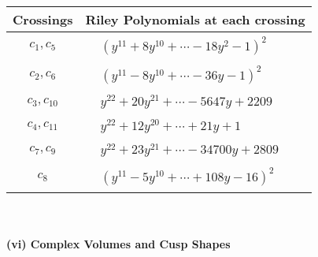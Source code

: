 \documentclass[1p]{elsarticle_modified}
\theoremstyle{definition}
\begin{document}
\begin{tabular}{m{50pt}|m{274pt}}
Crossings & \hspace{64pt}Riley Polynomials at each crossing \\
\hline $$\begin{aligned}c_{1},c_{5}\end{aligned}$$&$\begin{aligned}
&(y^{11}+8 y^{10}+\cdots-18 y^2-1)^{2}
\end{aligned}$\\
\hline $$\begin{aligned}c_{2},c_{6}\end{aligned}$$&$\begin{aligned}
&(y^{11}-8 y^{10}+\cdots-36 y-1)^{2}
\end{aligned}$\\
\hline $$\begin{aligned}c_{3},c_{10}\end{aligned}$$&$\begin{aligned}
&y^{22}+20 y^{21}+\cdots-5647 y+2209
\end{aligned}$\\
\hline $$\begin{aligned}c_{4},c_{11}\end{aligned}$$&$\begin{aligned}
&y^{22}+12 y^{20}+\cdots+21 y+1
\end{aligned}$\\
\hline $$\begin{aligned}c_{7},c_{9}\end{aligned}$$&$\begin{aligned}
&y^{22}+23 y^{21}+\cdots-34700 y+2809
\end{aligned}$\\
\hline $$\begin{aligned}c_{8}\end{aligned}$$&$\begin{aligned}
&(y^{11}-5 y^{10}+\cdots+108 y-16)^{2}
\end{aligned}$\\
\hline
\end{tabular}\\~\\
\newpage\flushleft \textbf{(vi) Complex Volumes and Cusp Shapes}
\end{document}
